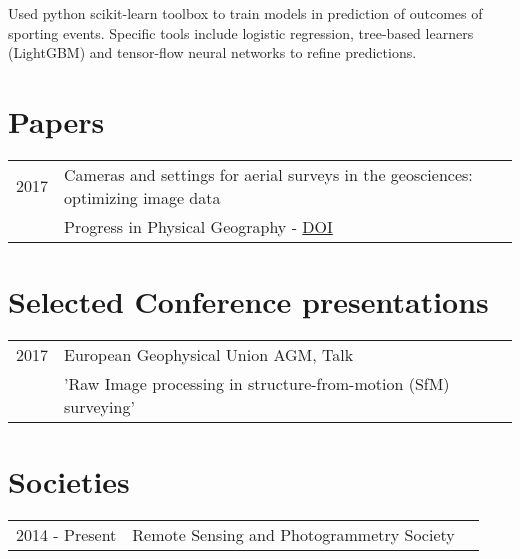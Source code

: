 \documentclass[]{deedy-resume-openfont}
\begin{document}
\begin{minipage}[t]{0.66\textwidth}
\linebreak
{}
Used python scikit-learn toolbox to train models in prediction of outcomes of sporting events.
Specific tools include logistic regression, tree-based learners (LightGBM) and tensor-flow neural
networks to refine predictions.
\sectionsep


\section{Papers}\label{sec:papers}

\begin{tabular}{rll}
2017	& Cameras and settings for aerial surveys in the geosciences: optimizing image data \\
&Progress in Physical Geography - \href{https://dx.doi.org/10.1177/0309133317703092}{DOI}
 \\
\end{tabular}
\sectionsep

\section{Selected Conference presentations}\label{sec:selected-conference-presentations}
\begin{tabular}{rll}
2017	     & European Geophysical Union AGM, Talk\\
&'Raw Image processing in structure-from-motion (SfM) surveying'\\
\end{tabular}
\sectionsep


\section{Societies}\label{sec:societies}

\begin{tabular}{rll}
2014 - Present	& Remote Sensing and Photogrammetry Society\\
\end{tabular}
\sectionsep

\end{minipage}
\end{document}
